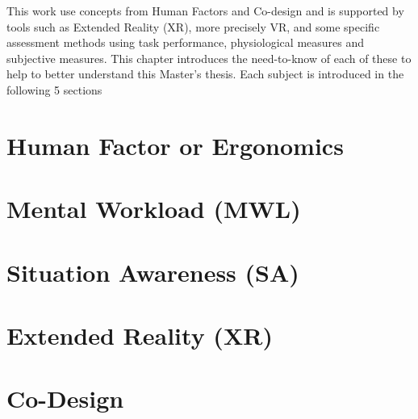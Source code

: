 
This work use concepts from Human Factors and Co-design and is supported by tools such as Extended Reality (XR), more precisely VR, and some specific assessment methods using task performance, physiological measures and subjective measures. This chapter introduces the need-to-know of each of these to help to better understand this Master's thesis. Each subject is introduced in the following 5 sections

\section{Human Factor or Ergonomics}
\label{sec:human_factors}

    

\section{Mental Workload (MWL)}
\label{sec:mental_workload}

    

\section{Situation Awareness (SA)}
\label{sec:situation_awareness}

    

\section{Extended Reality (XR)}
\label{sec:extended_reality}

        
    

\section{Co-Design}
\label{sec:co_design}

    
